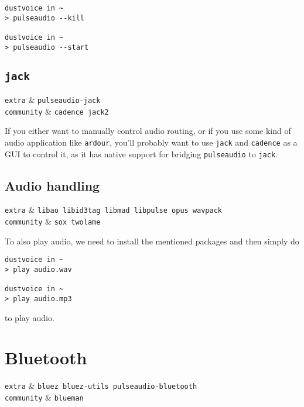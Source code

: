 \documentclass[10pt]{dustdoc}
\begin{document}
\begin{verbatim}
dustvoice in ~
> pulseaudio --kill

dustvoice in ~
> pulseaudio --start
\end{verbatim}


\subsection{\texttt{jack}}%
\label{sec:jack}

\begin{pkgtable}
    \texttt{extra} & \texttt{pulseaudio-jack} \\
    \texttt{community} & \texttt{cadence jack2} \\
\end{pkgtable}

If you either want to manually control audio routing, or if you use some kind of audio application like \texttt{ardour}, you’ll probably want to use \texttt{jack} and \texttt{cadence} as a GUI to control it, as it has native support for bridging \texttt{pulseaudio} to \texttt{jack}.

\subsection{Audio handling}%
\label{sec:audio-handling}

\begin{pkgtable}
    \texttt{extra} & \texttt{libao libid3tag libmad libpulse opus wavpack} \\
    \texttt{community} & \texttt{sox twolame} \\
\end{pkgtable}

To also play audio, we need to install the mentioned packages and then simply do

\begin{verbatim}
dustvoice in ~
> play audio.wav

dustvoice in ~
> play audio.mp3
\end{verbatim}


\noindent
to play audio.

\section{Bluetooth}%
\label{sec:bluetooth}

\begin{pkgtable}
    \texttt{extra} & \texttt{bluez bluez-utils pulseaudio-bluetooth} \\
    \texttt{community} & \texttt{blueman} \\
\end{pkgtable}
\end{document}
